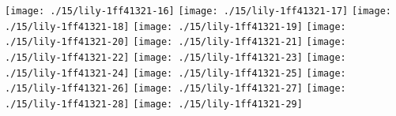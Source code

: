   \linebreak
\else
  \expandafter{}%
\fi
\texttt{[image: ./15/lily-1ff41321-16]}%
\ifx\betweenLilyPondSystem \undefined
  \linebreak
\else
  \expandafter{}%
\fi
\texttt{[image: ./15/lily-1ff41321-17]}%
\ifx\betweenLilyPondSystem \undefined
  \linebreak
\else
  \expandafter{}%
\fi
\texttt{[image: ./15/lily-1ff41321-18]}%
\ifx\betweenLilyPondSystem \undefined
  \linebreak
\else
  \expandafter{}%
\fi
\texttt{[image: ./15/lily-1ff41321-19]}%
\ifx\betweenLilyPondSystem \undefined
  \linebreak
\else
  \expandafter{}%
\fi
\texttt{[image: ./15/lily-1ff41321-20]}%
\ifx\betweenLilyPondSystem \undefined
  \linebreak
\else
  \expandafter{}%
\fi
\texttt{[image: ./15/lily-1ff41321-21]}%
\ifx\betweenLilyPondSystem \undefined
  \linebreak
\else
  \expandafter{}%
\fi
\texttt{[image: ./15/lily-1ff41321-22]}%
\ifx\betweenLilyPondSystem \undefined
  \linebreak
\else
  \expandafter{}%
\fi
\texttt{[image: ./15/lily-1ff41321-23]}%
\ifx\betweenLilyPondSystem \undefined
  \linebreak
\else
  \expandafter{}%
\fi
\texttt{[image: ./15/lily-1ff41321-24]}%
\ifx\betweenLilyPondSystem \undefined
  \linebreak
\else
  \expandafter{}%
\fi
\texttt{[image: ./15/lily-1ff41321-25]}%
\ifx\betweenLilyPondSystem \undefined
  \linebreak
\else
  \expandafter{}%
\fi
\texttt{[image: ./15/lily-1ff41321-26]}%
\ifx\betweenLilyPondSystem \undefined
  \linebreak
\else
  \expandafter{}%
\fi
\texttt{[image: ./15/lily-1ff41321-27]}%
\ifx\betweenLilyPondSystem \undefined
  \linebreak
\else
  \expandafter{}%
\fi
\texttt{[image: ./15/lily-1ff41321-28]}%
\ifx\betweenLilyPondSystem \undefined
  \linebreak
\else
  \expandafter{}%
\fi
\texttt{[image: ./15/lily-1ff41321-29]}%
\ifx\betweenLilyPondSystem \undefined
  \linebreak
